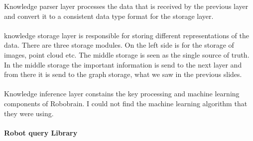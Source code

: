\documentclass[10pt]{article}
\begin{document}
Knowledge parser layer  processes the data that is received by the previous layer and convert it to a consistent data type format for the storage layer.\\\\
knowledge storage layer is responsible for storing different representations of the data.  There are three storage modules. On the left side is for the storage of images, point cloud etc. The middle storage is seen as the single source of truth. In the middle storage the important information is send to the next layer and from there it is send to the graph storage, what we saw in the previous slides. \\\\
Knowledge inference layer constains the key processing and machine learning components of Robobrain. I could not find the machine learning algorithm that they were using.\\\\
\textbf{Robot query Library}\\
\end{document}
